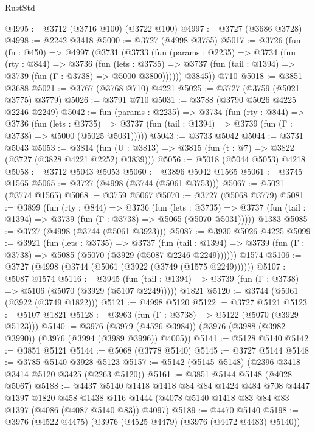 \begin{lexlean}{RustStd}
\begin{coremodule}
@4995 := @3712 (@3716 @100) (@3722 @100)
@4997 := @3727 (@3686 @3728)
@4998 := @2242 @3418
@5000 := @3727 (@4998 @3755)
@5017 := @3726
    (fun (fn : @450) =>
    @4997
      (@3731
        (@3733
          (fun (params : @2235) =>
          @3734
            (fun (rty : @844) =>
            @3736
              (fun (lets : @3735) =>
              @3737 (fun (tail : @1394) => @3739 (fun (Γ : @3738) => @5000 @3800))))))
        @3845))
    @710
@5018 := @3851 @3688
@5021 := @3767 (@3768 @710) @4221
@5025 := @3727 (@3759 (@5021 @3775) @3779)
@5026 := @3791 @710
@5031 := @3788 (@3790 @5026 @4225 @2246 @2249)
@5042 := fun (params : @2235) =>
  @3734
    (fun (rty : @844) =>
    @3736
      (fun (lets : @3735) =>
      @3737 (fun (tail : @1394) => @3739 (fun (Γ : @3738) => @5000 (@5025 @5031)))))
@5043 := @3733 @5042
@5044 := @3731 @5043
@5053 := @3814 (fun (U : @3813) => @3815 (fun (t : @7) => @3822 (@3727 (@3828 @4221 @2252) @3839)))
@5056 := @5018 (@5044 @5053) @4218
@5058 := @3712 @5043 @5053
@5060 := @3896 @5042 @1565
@5061 := @3745 @1565
@5065 := @3727 (@4998 (@3744 (@5061 @3753)))
@5067 := @5021 (@3774 @1565)
@5068 := @3759 @5067
@5070 := @3727 (@5068 @3779)
@5081 := @3899
    (fun (rty : @844) =>
    @3736
      (fun (lets : @3735) =>
      @3737 (fun (tail : @1394) => @3739 (fun (Γ : @3738) => @5065 (@5070 @5031)))))
    @1383
@5085 := @3727 (@4998 (@3744 (@5061 @3923)))
@5087 := @3930 @5026 @4225
@5099 := @3921
    (fun (lets : @3735) =>
    @3737
      (fun (tail : @1394) => @3739 (fun (Γ : @3738) => @5085 (@5070 (@3929 (@5087 @2246 @2249))))))
    @1574
@5106 := @3727 (@4998 (@3744 (@5061 (@3922 (@3749 (@1575 @2249))))))
@5107 := @5087 @1574
@5116 := @3945
    (fun (tail : @1394) => @3739 (fun (Γ : @3738) => @5106 (@5070 (@3929 (@5107 @2249)))))
    @1821
@5120 := @3744 (@5061 (@3922 (@3749 @1822)))
@5121 := @4998 @5120
@5122 := @3727 @5121
@5123 := @5107 @1821
@5128 := @3963 (fun (Γ : @3738) => @5122 (@5070 (@3929 @5123)))
@5140 := @3976
    (@3979 (@4526 @3984))
    (@3976 (@3988 (@3982 @3990)) (@3976 (@3994 (@3989 @3996)) @4005))
@5141 := @5128 @5140
@5142 := @3851 @5121
@5144 := @5068 (@3778 @5140)
@5145 := @3727 @5144
@5148 := @3785 @5140 @3928 @5123
@5157 := @5142 (@5145 @5148) (@2396 @3418 @3414 @5120 @3425 (@2263 @5120))
@5161 := @3851 @5144 @5148 (@4028 @5067)
@5188 := @4437
    @5140
    @1418
    @1418
    @84
    @84
    @1424
    @484
    @708
    @4447
    @1397
    @1820
    @458
    @1438
    @116
    @1444
    (@4078 @5140 @1418 @83 @84 @83 @1397 (@4086 (@4087 @5140 @83)) @4097)
@5189 := @4470 @5140
@5198 := @3976 (@4522 @4475) (@3976 (@4525 @4479) (@3976 (@4472 @4483) @5140))

\end{coremodule}
\end{lexlean}
